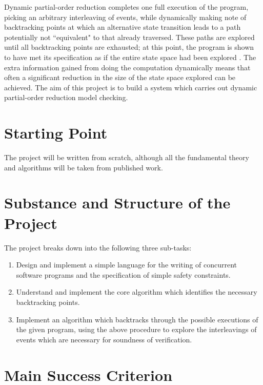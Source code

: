\documentclass[12pt,a4paper,twoside]{article}
\begin{document}
Dynamic partial-order reduction completes one full execution of the
program, picking an arbitrary interleaving of events, while dynamically making note
of backtracking points at which an alternative state transition leads to a path potentially not
``equivalent" to that already traversed. These paths are explored until all backtracking
points are exhausted; at this point, the program is shown to have met its specification
as if the entire state space had been explored \cite{popl05}. The extra information gained
from doing the computation dynamically means that often a significant reduction in the
size of the state space explored can be achieved. The aim of this project is to build a
system which carries out dynamic partial-order reduction model checking.

\section*{Starting Point}

The project will be written from scratch, although all the fundamental
theory and algorithms will be taken from published work.

\section*{Substance and Structure of the Project}

The project breaks down into the following three sub-tasks:

\begin{enumerate}
	\item Design and implement a simple language for the writing of
	concurrent software programs and the specification of simple
	safety constraints.
	
	\item Understand and implement the core algorithm which identifies
	the necessary backtracking points.
	
	\item Implement an algorithm which backtracks through the possible
	executions of the given program, using the above procedure to explore the
	interleavings of events which are necessary for soundness of verification.
\end{enumerate}

\section*{Main Success Criterion}
\end{document}
